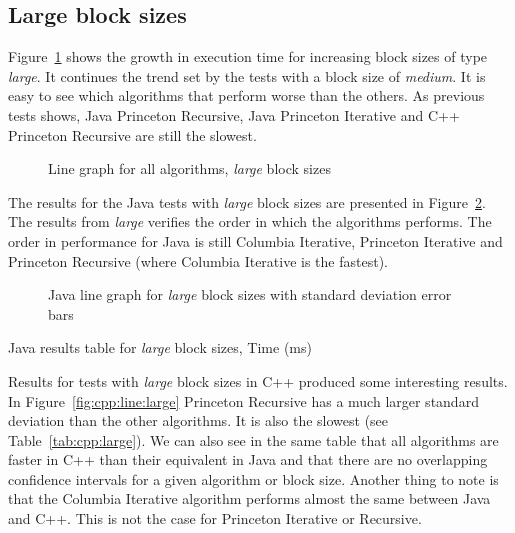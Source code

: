 \subsection{Large block sizes}
Figure~\ref{fig:all:line:large} shows the growth in execution time for increasing block sizes of type \emph{large}. It continues the trend set by the tests with a block size of \emph{medium}. It is easy to see which algorithms that perform worse than the others. As previous tests shows, Java Princeton Recursive, Java Princeton Iterative and C++ Princeton Recursive are still the slowest.

\begin{figure}
    \centering
    
    \caption{Line graph for all algorithms, \emph{large} block sizes}
    \label{fig:all:line:large}
\end{figure}

The results for the Java tests with \emph{large} block sizes are presented in Figure~\ref{fig:java:line:large}. The results from \emph{large} verifies the order in which the algorithms performs. The order in performance for Java is still Columbia Iterative, Princeton Iterative and Princeton Recursive (where Columbia Iterative is the fastest).

\begin{figure}
    \centering
    
    \caption{Java line graph for \emph{large} block sizes with standard deviation error bars}
    \label{fig:java:line:large}
\end{figure}
\begin{table}
    \centering
    \caption{Java results table for \emph{large} block sizes, Time (ms)}
    \label{tab:java:large}
    
\end{table}

Results for tests with \emph{large} block sizes in C++ produced some interesting results. In Figure~\ref{fig:cpp:line:large} Princeton Recursive has a much larger standard deviation than the other algorithms. It is also the slowest (see Table~\ref{tab:cpp:large}). We can also see in the same table that all algorithms are faster in C++ than their equivalent in Java and that there are no overlapping confidence intervals for a given algorithm or block size. Another thing to note is that the Columbia Iterative algorithm performs almost the same between Java and C++. This is not the case for Princeton Iterative or Recursive.

